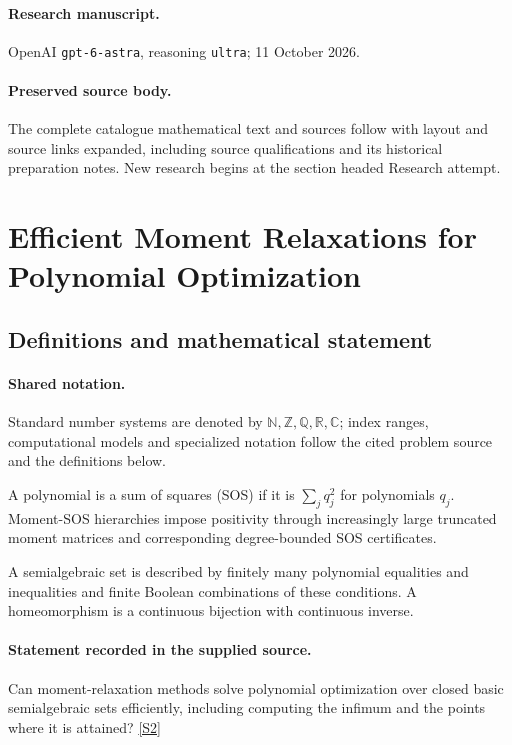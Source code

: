 \documentclass[11pt]{article}
\begin{document}
\paragraph{Research manuscript.} OpenAI \texttt{gpt-6-astra}, reasoning \texttt{ultra}; 11 October 2026.
\paragraph{Preserved source body.} The complete catalogue mathematical text and sources follow with layout and source links expanded, including source qualifications and its historical preparation notes. New research begins at the section headed Research attempt.

\section{Efficient Moment Relaxations for Polynomial Optimization}\label{statement}

\subsection{Definitions and mathematical statement}

\paragraph{Shared notation.}Standard number systems are denoted by $\mathbb N,\mathbb Z,\mathbb Q,\mathbb R,\mathbb C$; index ranges, computational models and specialized notation follow the cited problem source and the definitions below.


A polynomial is a sum of squares (SOS) if it is $\sum_j q_j^2$ for polynomials $q_j$. Moment-SOS hierarchies impose positivity through increasingly large truncated moment matrices and corresponding degree-bounded SOS certificates.

A semialgebraic set is described by finitely many polynomial equalities and inequalities and finite Boolean combinations of these conditions. A homeomorphism is a continuous bijection with continuous inverse.
\paragraph{Statement recorded in the supplied source.}
Can moment-relaxation methods solve polynomial optimization over closed basic semialgebraic sets efficiently, including computing the infimum and the points where it is attained? \href{https://doi.org/10.4171/owr/2014/17}{[S2]}
\end{document}
